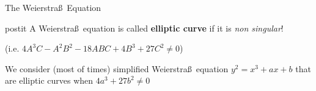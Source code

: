 \documentclass[12pt,handout]{beamer} %
\theoremstyle{definition}
\begin{document}
\begin{frame}{The Weierstra\ss\ Equation}
\begin{center}
\pause
{}\pause
{}\pause
\end{center}\pause

\begin{center}
 
 \begin{beamercolorbox}[sep=1em,wd=9.5cm]{postit}
A Weierstra\ss\ equation  is called \textbf{elliptic curve} if it is \emph{non singular}!\pause

(i.e. $4A^3C-A^2B^2-18ABC+4B^3+27C^2\ne0$)
 \end{beamercolorbox}
\end{center}\pause

We consider (most of times) simplified Weierstra\ss\ equation $y^2=x^3+ax+b$ that are elliptic curves when
$4a^3+27b^2\neq0$
 \end{frame}
\end{document}
